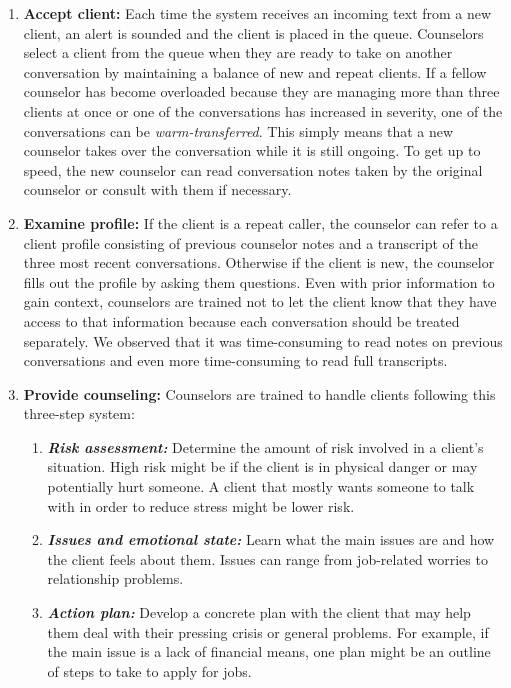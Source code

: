 \begin{enumerate}
  \item \textbf{Accept client:} Each time the system receives an incoming text from a new client, an alert is sounded and the client is placed in the queue. Counselors select a client from the queue when they are ready to take on another conversation by maintaining a balance of new and repeat clients. If a fellow counselor has become overloaded because they are managing more than three clients at once or one of the conversations has increased in severity, one of the conversations can be \textit{warm-transferred}. This simply means that a new counselor takes over the conversation while it is still ongoing. To get up to speed, the new counselor can read conversation notes taken by the original counselor or consult with them if necessary.
  \item \textbf{Examine profile:} If the client is a repeat caller, the counselor can refer to a client profile consisting of previous counselor notes and a transcript of the three most recent conversations. Otherwise if the client is new, the counselor fills out the profile by asking them questions.
Even with prior information to gain context, counselors are trained not to let the client know that they have access to that information because each conversation should be treated separately. We observed that it was time-consuming to read notes on previous conversations and even more time-consuming to read full transcripts.
  \item \textbf{Provide counseling:} Counselors are trained to handle clients following this three-step system:
  \begin{enumerate}
    \item \textbf{\textit{Risk assessment:}} Determine the amount of risk involved in a client's situation. High risk might be if the client is in physical danger or may potentially hurt someone. A client that mostly wants someone to talk with in order to reduce stress might be lower risk.
    \item \textbf{\textit{Issues and emotional state:}} Learn what the main issues are and how the client feels about them. Issues can range from job-related worries to relationship problems.
    \item \textbf{\textit{Action plan:}} Develop a concrete plan with the client that may help them deal with their pressing crisis or general problems. For example, if the main issue is a lack of financial means, one plan might be an outline of steps to take to apply for jobs.

\end{enumerate}
\end{enumerate}
